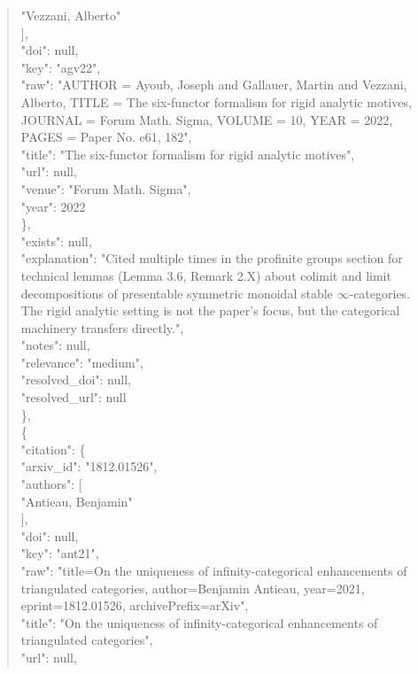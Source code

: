 \documentclass[11pt]{article}
\begin{document}
\begin{quote}
          "Vezzani, Alberto"\\
        ],\\
        "doi": null,\\
        "key": "agv22",\\
        "raw": "AUTHOR = Ayoub, Joseph and Gallauer, Martin and Vezzani, Alberto, TITLE = The six-functor formalism for rigid analytic motives, JOURNAL = Forum Math. Sigma, VOLUME = 10, YEAR = 2022, PAGES = Paper No. e61, 182",\\
        "title": "The six-functor formalism for rigid analytic motives",\\
        "url": null,\\
        "venue": "Forum Math. Sigma",\\
        "year": 2022\\
      \},\\
      "exists": null,\\
      "explanation": "Cited multiple times in the profinite groups section for technical lemmas (Lemma 3.6, Remark 2.X) about colimit and limit decompositions of presentable symmetric monoidal stable \ensuremath{\infty}-categories. The rigid analytic setting is not the paper's focus, but the categorical machinery transfers directly.",\\
      "notes": null,\\
      "relevance": "medium",\\
      "resolved\_doi": null,\\
      "resolved\_url": null\\
    \},\\
    \{\\
      "citation": \{\\
        "arxiv\_id": "1812.01526",\\
        "authors": [\\
          "Antieau, Benjamin"\\
        ],\\
        "doi": null,\\
        "key": "ant21",\\
        "raw": "title=On the uniqueness of infinity-categorical enhancements of triangulated categories, author=Benjamin Antieau, year=2021, eprint=1812.01526, archivePrefix=arXiv",\\
        "title": "On the uniqueness of infinity-categorical enhancements of triangulated categories",\\
        "url": null,\\

\end{quote}
\end{document}
